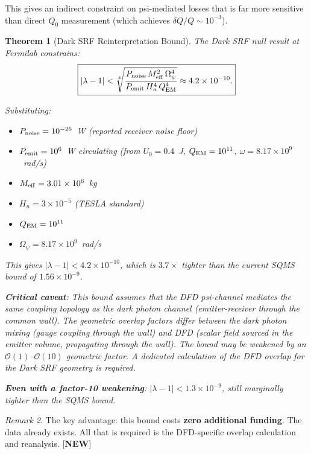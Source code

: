 \documentclass[11pt]{article}
\newcommand{\lam}{\lambda}
\newcommand{\Opsi}{\Omega_\psi}
\newcommand{\Meff}{M_{\rm eff}}
\newcommand{\order}[1]{\mathcal{O}(#1)}
\newcommand{\ee}[1]{\times 10^{#1}}
\newcommand{\QEM}{Q_{\rm EM}}
\newcommand{\Heff}{H_n}
\newcommand{\lbone}{|\lam - 1|}
\newtheorem{theorem}{Theorem}[section]
\theoremstyle{definition}
\theoremstyle{remark}
\newtheorem{remark}[theorem]{Remark}
\begin{document}
This gives an indirect constraint on psi-mediated losses that is
far more sensitive than direct $Q_0$ measurement (which achieves
$\delta Q/Q \sim 10^{-3}$).

\begin{theorem}[Dark SRF Reinterpretation Bound]
\label{thm:dark_srf}
The Dark SRF null result at Fermilab constrains:
\begin{equation}
\boxed{
\lbone < \sqrt[4]{\frac{P_{\rm noise}\,\Meff^2\,\Opsi^4}
{P_{\rm emit}\,\Heff^4\,\QEM^4}}
\approx 4.2\ee{-10}.
}
\label{eq:dark_srf_bound}
\end{equation}

Substituting:
\begin{itemize}[nosep]
\item $P_{\rm noise} = 10^{-26}$~W (reported receiver noise floor)
\item $P_{\rm emit} = 10^6$~W circulating (from $U_0 = 0.4$~J,
  $\QEM = 10^{11}$, $\omega = 8.17\ee{9}$~rad/s)
\item $\Meff = 3.01\ee{6}$~kg
\item $\Heff = 3\ee{-5}$ (TESLA standard)
\item $\QEM = 10^{11}$
\item $\Opsi = 8.17\ee{9}$~rad/s
\end{itemize}

This gives $\lbone < 4.2\ee{-10}$, which is $3.7\times$ tighter
than the current SQMS bound of $1.56\ee{-9}$.

\textbf{Critical caveat}: This bound assumes that the DFD psi-channel
mediates the same coupling topology as the dark photon channel
(emitter-receiver through the common wall). The geometric overlap
factors differ between the dark photon mixing (gauge coupling through
the wall) and DFD (scalar field sourced in the emitter volume,
propagating through the wall). The bound may be weakened by an
$\order{1}$--$\order{10}$ geometric factor. A dedicated calculation
of the DFD overlap for the Dark SRF geometry is required.

\textbf{Even with a factor-10 weakening}: $\lbone < 1.3\ee{-9}$,
still marginally tighter than the SQMS bound.
\end{theorem}

\begin{remark}
The key advantage: this bound costs \textbf{zero additional funding}.
The data already exists. All that is required is the DFD-specific
overlap calculation and reanalysis. [\textbf{NEW}]
\end{remark}
\end{document}
